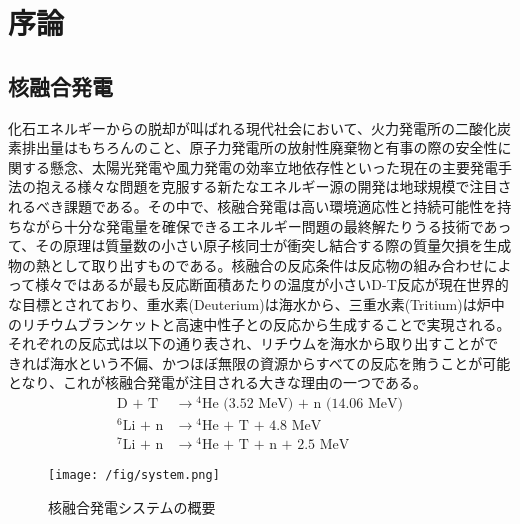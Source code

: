 \chapter{序論}

\section{核融合発電}
化石エネルギーからの脱却が叫ばれる現代社会において、火力発電所の二酸化炭素排出量はもちろんのこと、原子力発電所の放射性廃棄物と有事の際の安全性に関する懸念、太陽光発電や風力発電の効率立地依存性といった現在の主要発電手法の抱える様々な問題を克服する新たなエネルギー源の開発は地球規模で注目されるべき課題である。その中で、核融合発電は高い環境適応性と持続可能性を持ちながら十分な発電量を確保できるエネルギー問題の最終解たりうる技術であって、その原理は質量数の小さい原子核同士が衝突し結合する際の質量欠損を生成物の熱として取り出すものである。核融合の反応条件は反応物の組み合わせによって様々ではあるが最も反応断面積あたりの温度が小さいD-T反応が現在世界的な目標とされており、重水素(Deuterium)は海水から、三重水素(Tritium)は炉中のリチウムブランケットと高速中性子との反応から生成することで実現される。それぞれの反応式は以下の通り表され\cite{plasma}、リチウムを海水から取り出すことができれば海水という不偏、かつほぼ無限の資源からすべての反応を賄うことが可能となり、これが核融合発電が注目される大きな理由の一つである。
\begin{align}
\text{D + T}&\longrightarrow{}^{4}\text{He (3.52 MeV) + n (14.06 MeV)}\\
{}^{6}\text{Li + n}&\longrightarrow{}^{4}\text{He + T + 4.8 MeV}\\
{}^{7}\text{Li + n}&\longrightarrow{}^{4}\text{He + T + n + 2.5 MeV}
\end{align}
\begin{figure}[H]\centering\texttt{[image: /fig/system.png]}
	\caption{核融合発電システムの概要\cite{PF}}\label{fig:system}
\end{figure}

